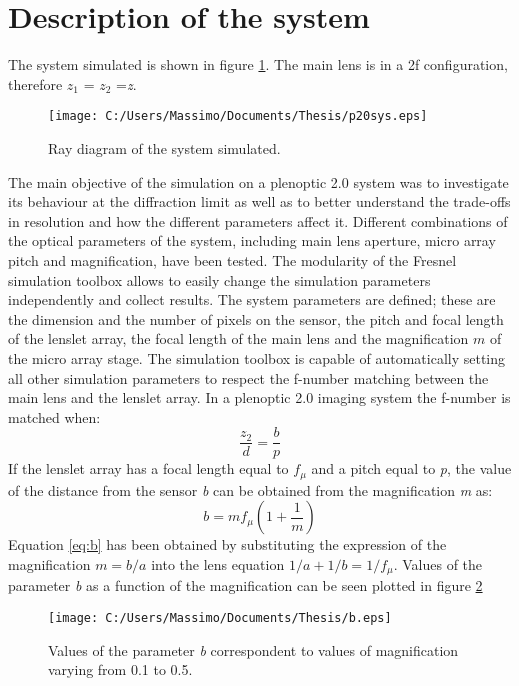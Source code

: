 \section{Description of the system}
\label{sec:descrSYS20}
The system simulated is shown in figure \ref{fig:sys}. The main lens is in a 2f configuration, therefore $z_1$ = $z_2$ =\textit{z}.
\begin{figure}[H]
	\centering
	\texttt{[image: C:/Users/Massimo/Documents/Thesis/p20sys.eps]}
	\caption{\label{fig:sys} Ray diagram of the system simulated.  }
\end{figure}
The main objective of the simulation on a plenoptic 2.0 system was to investigate its behaviour at the diffraction limit as well as to better understand the trade-offs in resolution and how the different parameters affect it. Different combinations of the optical parameters of the system, including main lens aperture, micro array pitch and magnification,  have been tested. The modularity of the Fresnel simulation toolbox allows to easily change the simulation parameters independently and collect results.
The system parameters are defined; these are the  dimension and the number of pixels on the sensor, the pitch and focal length of the lenslet array, the focal length of the main lens and the magnification $m$ of the micro array stage. The simulation toolbox is capable of automatically setting all other simulation parameters to respect the f-number matching between the main lens and the lenslet array. In a plenoptic 2.0 imaging system the f-number is matched when:
\begin{equation}
\label{eq:fmatch20}
\dfrac{z_2}{d}=\dfrac{b}{p}
\end{equation}
If the lenslet array has a focal length equal to $f_{\mu}$ and a pitch equal to \textit{p}, the value of the distance from the sensor \textit{b} can be obtained from the magnification \textit{m} as:
\begin{equation}
\label{eq:b}
b = mf_{\mu} \left(1+\dfrac{1}{m}\right)
\end{equation} 
Equation \ref{eq:b} has been obtained by substituting the expression of the magnification $m=b/a$ into the lens equation $1/a+1/b=1/f_{\mu}$.
Values of the parameter \textit{b} as a function of the magnification can be seen plotted in figure \ref{fig:b}
\begin{figure}[H]
	\centering
	\texttt{[image: C:/Users/Massimo/Documents/Thesis/b.eps]}
	\caption{\label{fig:b} Values of the parameter \textit{b} correspondent to values of magnification varying from 0.1 to 0.5.}
\end{figure}
